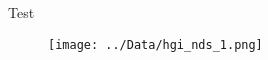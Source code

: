 \documentclass{article}
\begin{document}
Test
\begin{figure}
\centering
\texttt{[image: ../Data/hgi\_nds\_1.png]} 
\label{fig:1}
\end{figure}
\end{document}
